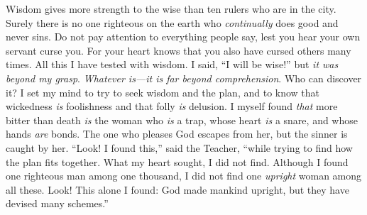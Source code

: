 \begin{biblechapter}
 Wisdom gives more strength to the wise 
than ten rulers who are in the city.
\verse Surely there is no one righteous on the earth 
who \textit{continually} does good and never sins.
\verse Do not pay attention to everything people say, 
lest you hear your own servant curse you.
\verse For your heart knows 
that you also have cursed others many times.
 All this I have tested with wisdom. I said, “I will be wise!” but \textit{it was beyond my grasp}.
\verse \textit{Whatever is—it is far beyond comprehension}. Who can discover it?
\verse I set my mind to try to seek wisdom and the plan, and to know that wickedness \textit{is} foolishness and that folly \textit{is} delusion.
\verse I myself found \textit{that} more bitter than death \textit{is} the woman who \textit{is} a trap, whose heart \textit{is} a snare, and whose hands \textit{are} bonds. The one who pleases God escapes from her, but the sinner is caught by her.
\verse “Look! I found this,” said the Teacher, “while trying to find how the plan fits together.
\verse What my heart sought, I did not find. Although I found one righteous man among one thousand, I did not find one \textit{upright} woman among all these.
\verse Look! This alone I found: God made mankind upright, but they have devised many schemes.”
\end{biblechapter}

